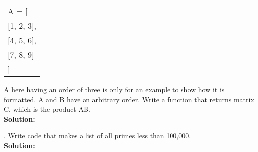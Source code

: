 \documentclass{article}
\newcommand{\icode}[1]{{\ttfamily #1}}
\newenvironment{code}{\begin{tcolorbox}\ttfamily}{\end{tcolorbox}}
\begin{document}
\begin{center} \ttfamily
	\begin{tabular}{|l}
		A = [\\
		\phantom{=   }[1, 2, 3],\\
		\phantom{=   }[4, 5, 6],\\
		\phantom{=   }[7, 8, 9]\\
		]
	\end{tabular}
\end{center}
\icode{A} here having an order of three is only for an example to show how it is formatted. \icode{A} and \icode{B} have an arbitrary order. Write a function that returns matrix \icode{C}, which is the product \icode{AB}.\\
\noindent \textbf{Solution:}
\begin{code}
	\vspace{6 in}
%

\end{code}

\newpage
{}. Write code that makes a list of all primes less than 100,000.\\
\noindent \textbf{Solution:}

\begin{code}
	\vspace{8 in}


\end{code}
\end{document}

